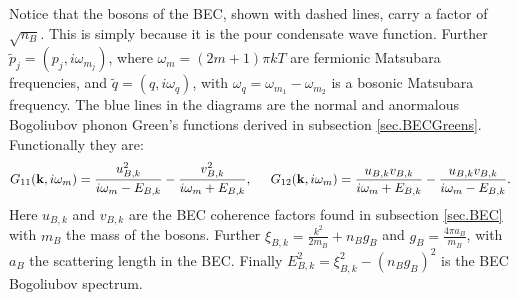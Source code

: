 Notice that the bosons of the BEC, shown with dashed lines, carry a factor of $\sqrt{n_B}$. This is simply because it is the pour condensate wave function. Further $\tilde{p}_j = (p_j, i\omega_{m_j})$, where $\omega_{m} = (2m+1)\pi kT$ are fermionic Matsubara frequencies, and $\tilde{q} = (q, i\omega_q )$, with $\omega_q = \omega_{m_1}-\omega_{m_2}$ is a bosonic Matsubara frequency. The blue lines in the diagrams are the normal and anormalous Bogoliubov phonon Green's functions derived in subsection \ref{sec.BECGreens}. Functionally they are:
\begin{equation}
G_{11}(\mathbf{k},i\omega_m) = \frac{u_{B,k}^2}{i\omega_m-E_{B,k}}-\frac{v_{B,k}^2}{i\omega_m+E_{B,k}}, \hspace{0.5cm} G_{12}(\mathbf{k},i\omega_m) = \frac{u_{B,k}v_{B,k}}{i\omega_m+E_{B,k}}-\frac{u_{B,k}v_{B,k}}{i\omega_m-E_{B,k}}.\nonumber
\end{equation}
Here $u_{B,k}$ and $v_{B,k}$ are the BEC coherence factors found in subsection \ref{sec.BEC} with $m_B$ the mass of the bosons. Further $\xi_{B,k} = \frac{k^2}{2m_B}+n_Bg_B$ and $g_B = \frac{4\pi a_B}{m_B}$, with $a_B$ the scattering length in the BEC. Finally $E_{B,k}^2 = \xi_{B,k}^2-(n_Bg_B)^2$ is the BEC Bogoliubov spectrum.

